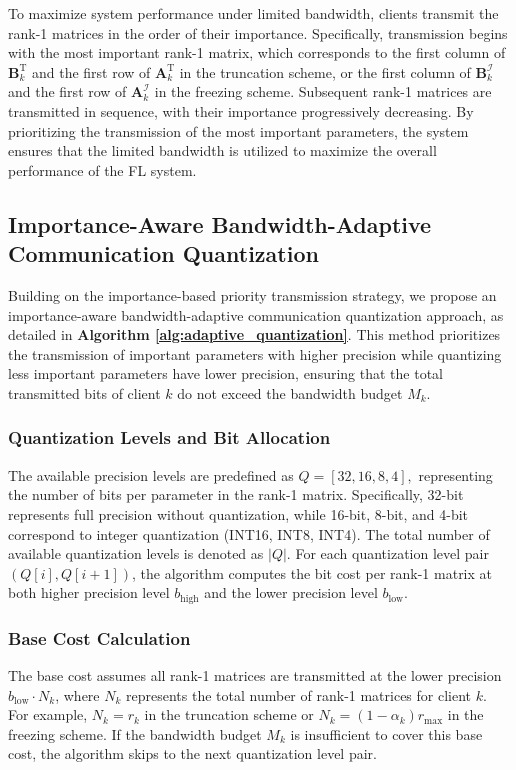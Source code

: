 \documentclass[journal]{IEEEtran}
\begin{document}
To maximize system performance under limited bandwidth, clients transmit the rank-1 matrices in the order of their importance. Specifically, transmission begins with the most important rank-1 matrix, which corresponds to the first column of \(\mathbf{B}_k^{\text{T}}\) and the first row of \(\mathbf{A}_k^{\text{T}}\) in the truncation scheme, or the first column of \(\mathbf{B}_k^{\mathcal{I}}\) and the first row of \(\mathbf{A}_k^{\mathcal{I}}\) in the freezing scheme. Subsequent rank-1 matrices are transmitted in sequence, with their importance progressively decreasing. By prioritizing the transmission of the most important parameters, the system ensures that the limited bandwidth is utilized to maximize the overall performance of the FL system.



\subsection{Importance-Aware Bandwidth-Adaptive Communication Quantization}
Building on the importance-based priority transmission strategy, we propose an importance-aware bandwidth-adaptive communication quantization approach, as detailed in \textbf{Algorithm \ref{alg:adaptive_quantization}}. This method prioritizes the transmission of important parameters with higher precision while quantizing less important parameters have lower precision, ensuring that the total transmitted bits of client $k$ do not exceed the bandwidth budget $M_k$.


\subsubsection{Quantization Levels and Bit Allocation}
The available precision levels are predefined as  
$Q = [32, 16, 8, 4],$  
representing the number of bits per parameter in the rank-1 matrix. Specifically, 32-bit represents full precision without quantization, while 16-bit, 8-bit, and 4-bit correspond to integer quantization (INT16, INT8, INT4).
The total number of available quantization levels is denoted as \( |Q| \).
For each quantization level pair \((Q[i], Q[i+1])\), the algorithm computes the bit cost per rank-1 matrix at both higher precision level  \(b_{\text{high}}\) and the lower precision level \(b_{\text{low}}\).

\subsubsection{Base Cost Calculation}
The base cost assumes all rank-1 matrices are transmitted at the lower precision \(b_{\text{low}} \cdot N_k\),
where \( N_k \) represents the total number of rank-1 matrices for client \( k \). For example, \( N_k = r_k \) in the truncation scheme or \( N_k =(1-\alpha_k)r_{\text{max}} \) in the freezing scheme.
If the bandwidth budget \(M_k\) is insufficient to cover this base cost, the algorithm skips to the next quantization level pair.
\end{document}
